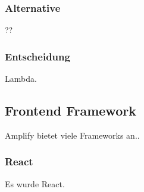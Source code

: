 \subsubsection{Alternative}
??

\subsubsection{Entscheidung}
Lambda.

\subsection{Frontend Framework}
Amplify bietet viele Frameworks an..

\subsubsection{React}
Es wurde React.
